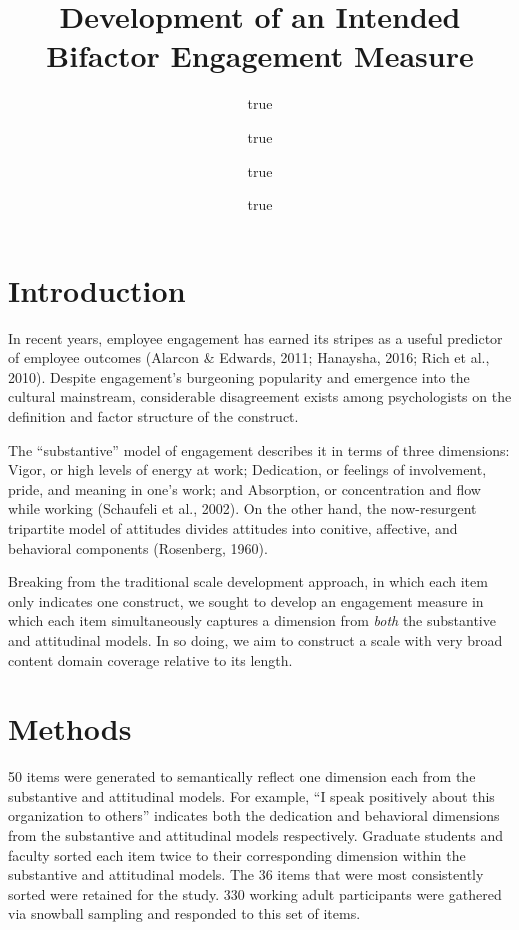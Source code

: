 \documentclass[
]{article}
\title{Development of an Intended Bifactor Engagement Measure}
\author{true \and true \and true \and true}
\date{}
\begin{document}
\maketitle

\hypertarget{introduction}{%
\section{Introduction}\label{introduction}}

In recent years, employee engagement has earned its stripes as a useful
predictor of employee outcomes (Alarcon \& Edwards, 2011; Hanaysha,
2016; Rich et al., 2010). Despite engagement's burgeoning popularity and
emergence into the cultural mainstream, considerable disagreement exists
among psychologists on the definition and factor structure of the
construct.

The ``substantive'' model of engagement describes it in terms of three
dimensions: Vigor, or high levels of energy at work; Dedication, or
feelings of involvement, pride, and meaning in one's work; and
Absorption, or concentration and flow while working (Schaufeli et al.,
2002). On the other hand, the now-resurgent tripartite model of
attitudes divides attitudes into conitive, affective, and behavioral
components (Rosenberg, 1960).

Breaking from the traditional scale development approach, in which each
item only indicates one construct, we sought to develop an engagement
measure in which each item simultaneously captures a dimension from
\emph{both} the substantive and attitudinal models. In so doing, we aim
to construct a scale with very broad content domain coverage relative to
its length.

\hypertarget{methods}{%
\section{Methods}\label{methods}}

50 items were generated to semantically reflect one dimension each from
the substantive and attitudinal models. For example, ``I speak
positively about this organization to others'' indicates both the
dedication and behavioral dimensions from the substantive and
attitudinal models respectively. Graduate students and faculty sorted
each item twice to their corresponding dimension within the substantive
and attitudinal models. The 36 items that were most consistently sorted
were retained for the study. 330 working adult participants were
gathered via snowball sampling and responded to this set of items.
\end{document}
